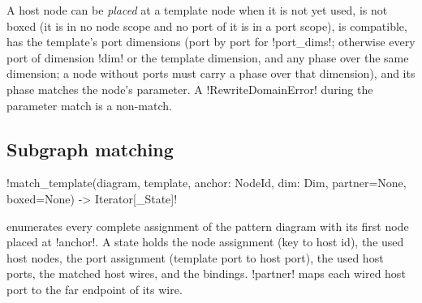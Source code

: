 A host node can be \emph{placed} at a template node when it is not yet used, is not boxed (it is
in no node scope and no port of it is in a port scope), is compatible, has the template's port
dimensions (port by port for \py!port_dims!; otherwise every port of dimension \py!dim! or the
template dimension, and any phase over the same dimension; a node without ports must carry a phase
over that dimension), and its phase matches the node's parameter. A \py!RewriteDomainError! during
the parameter match is a non-match.

\subsection{Subgraph matching}

\begin{signature}
\py!match_template(diagram, template, anchor: NodeId, dim: Dim, partner=None, boxed=None) -> Iterator[_State]!
\end{signature}
enumerates every complete assignment of the pattern diagram with its first node placed at
\py!anchor!. A state holds the node assignment (key to host id), the used host nodes, the port
assignment (template port to host port), the used host ports, the matched host wires, and the
bindings. \py!partner! maps each wired host port to the far endpoint of its wire.


